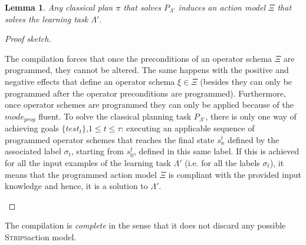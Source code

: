 \documentclass[letterpaper]{article} %
\newcommand{\strips}{\textsc{Strips}}     %
\newtheorem{lemma}[theorem]{Lemma}
\begin{document}
\begin{lemma}
Any classical plan $\pi$ that solves $P_{\Lambda'}$ induces an action model $\Xi$ that solves the learning task $\Lambda'$.
\end{lemma}

\begin{proof}[Proof sketch]
\begin{small}
The compilation forces that once the preconditions of an operator schema $\Xi$ are programmed, they cannot be altered. The same happens with the positive and negative effects that define an operator schema $\xi \in \Xi$ (besides they can only be programmed after the operator preconditions are programmed). Furthermore, once operator schemes are programmed they can only be applied because of the $mode_{prog}$ fluent. To solve the classical planning task $P_{\Lambda'}$, there is only one way of achieving goals $\{test_t\}$,{\small $1\leq t\leq \tau$}: executing an applicable sequence of programmed operator schemes that reaches the final state $s_n^t$ defined by the associated label $\sigma_t$, starting from $s_0^t$, defined in this same label. If this is achieved for all the input examples of the learning task $\Lambda'$ (i.e. for all the labels $\sigma_t$), it means that the programmed action model $\Xi$ is compliant with the provided input knowledge and hence, it is a solution to $\Lambda'$.
\end{small}
\end{proof}

The compilation is {\em complete} in the sense that it does not discard any possible \strips action model.
\end{document}
